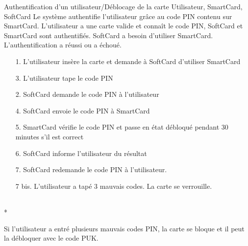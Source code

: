 \documentclass[a4paper,11pt,french]{article}
\begin{document}
\fiche
    {Authentification d'un utilisateur/Déblocage de la carte}
	{Utilisateur, SmartCard, SoftCard}
	{Le système authentifie l'utilisateur grâce au code PIN contenu sur SmartCard.}
	{L'utilisateur a une carte valide et connaît le code PIN, SoftCard et SmartCard sont authentifiés.}
    {SoftCard a besoin d'utiliser SmartCard.}
    {L'authentification a réussi ou a échoué.}
    {\begin{itemize}
        \item[]
        \item[1.] L'utilisateur insère la carte et demande à SoftCard 
            d'utiliser SmartCard
        \item[3.] L'utilisateur tape le code PIN
    \end{itemize}
    }
	{\begin{itemize}
        \item[]
		\item[2.] SoftCard demande le code PIN à l'utilisateur
        \item[4.] SoftCard envoie le code PIN à SmartCard
        \item[5.] SmartCard vérifie le code PIN et passe en état 
            \og{}débloqué \fg{} pendant 30 minutes s'il est correct
        \item[6.] SoftCard informe l’utilisateur du résultat
	\end{itemize}
	}
	{}
\flots
{\begin{itemize}
        \item[]
        \item[7.] SoftCard redemande le code PIN à l'utilisateur.
\end{itemize}}
    {\begin{itemize}
    \item[]
    \item[7 bis.] L'utilisateur a tapé 3 mauvais codes. La carte se verrouille.
    \end{itemize}
    }
	{}    
\\*

Si l'utilisateur a entré plusieurs mauvais codes PIN, la carte se bloque et il 
peut la débloquer avec le code PUK.\\
\end{document}
